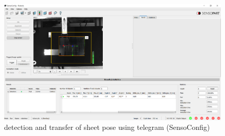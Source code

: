 \begin{figure}[h]
    \centering
    \includegraphics[width=\textwidth]{figures/sheet-pickup/sensoconfig.PNG}
    \caption{detection and transfer of sheet pose using telegram (SensoConfig)}
    \label{fig:sensoconfig-pattern}
\end{figure}


